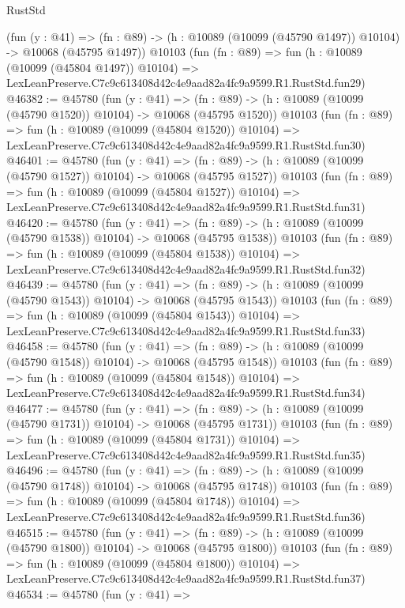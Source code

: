 \begin{lexlean}{RustStd}
\begin{coremodule}
    (fun (y : @41) =>
    (fn : @89) -> (h : @10089 (@10099 (@45790 @1497)) @10104) -> @10068 (@45795 @1497))
    @10103
    (fun (fn : @89) =>
    fun (h : @10089 (@10099 (@45804 @1497)) @10104) =>
    LexLeanPreserve.C7c9c613408d42c4e9aad82a4fc9a9599.R1.RustStd.fun29)
@46382 := @45780
    (fun (y : @41) =>
    (fn : @89) -> (h : @10089 (@10099 (@45790 @1520)) @10104) -> @10068 (@45795 @1520))
    @10103
    (fun (fn : @89) =>
    fun (h : @10089 (@10099 (@45804 @1520)) @10104) =>
    LexLeanPreserve.C7c9c613408d42c4e9aad82a4fc9a9599.R1.RustStd.fun30)
@46401 := @45780
    (fun (y : @41) =>
    (fn : @89) -> (h : @10089 (@10099 (@45790 @1527)) @10104) -> @10068 (@45795 @1527))
    @10103
    (fun (fn : @89) =>
    fun (h : @10089 (@10099 (@45804 @1527)) @10104) =>
    LexLeanPreserve.C7c9c613408d42c4e9aad82a4fc9a9599.R1.RustStd.fun31)
@46420 := @45780
    (fun (y : @41) =>
    (fn : @89) -> (h : @10089 (@10099 (@45790 @1538)) @10104) -> @10068 (@45795 @1538))
    @10103
    (fun (fn : @89) =>
    fun (h : @10089 (@10099 (@45804 @1538)) @10104) =>
    LexLeanPreserve.C7c9c613408d42c4e9aad82a4fc9a9599.R1.RustStd.fun32)
@46439 := @45780
    (fun (y : @41) =>
    (fn : @89) -> (h : @10089 (@10099 (@45790 @1543)) @10104) -> @10068 (@45795 @1543))
    @10103
    (fun (fn : @89) =>
    fun (h : @10089 (@10099 (@45804 @1543)) @10104) =>
    LexLeanPreserve.C7c9c613408d42c4e9aad82a4fc9a9599.R1.RustStd.fun33)
@46458 := @45780
    (fun (y : @41) =>
    (fn : @89) -> (h : @10089 (@10099 (@45790 @1548)) @10104) -> @10068 (@45795 @1548))
    @10103
    (fun (fn : @89) =>
    fun (h : @10089 (@10099 (@45804 @1548)) @10104) =>
    LexLeanPreserve.C7c9c613408d42c4e9aad82a4fc9a9599.R1.RustStd.fun34)
@46477 := @45780
    (fun (y : @41) =>
    (fn : @89) -> (h : @10089 (@10099 (@45790 @1731)) @10104) -> @10068 (@45795 @1731))
    @10103
    (fun (fn : @89) =>
    fun (h : @10089 (@10099 (@45804 @1731)) @10104) =>
    LexLeanPreserve.C7c9c613408d42c4e9aad82a4fc9a9599.R1.RustStd.fun35)
@46496 := @45780
    (fun (y : @41) =>
    (fn : @89) -> (h : @10089 (@10099 (@45790 @1748)) @10104) -> @10068 (@45795 @1748))
    @10103
    (fun (fn : @89) =>
    fun (h : @10089 (@10099 (@45804 @1748)) @10104) =>
    LexLeanPreserve.C7c9c613408d42c4e9aad82a4fc9a9599.R1.RustStd.fun36)
@46515 := @45780
    (fun (y : @41) =>
    (fn : @89) -> (h : @10089 (@10099 (@45790 @1800)) @10104) -> @10068 (@45795 @1800))
    @10103
    (fun (fn : @89) =>
    fun (h : @10089 (@10099 (@45804 @1800)) @10104) =>
    LexLeanPreserve.C7c9c613408d42c4e9aad82a4fc9a9599.R1.RustStd.fun37)
@46534 := @45780
    (fun (y : @41) =>

\end{coremodule}
\end{lexlean}
